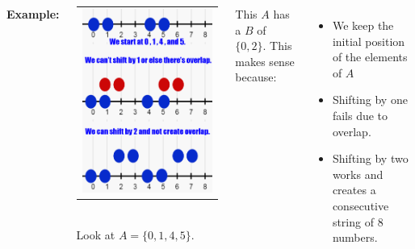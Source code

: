 \begin{columns}
{ \textcolor{colorTwo}{\textbf{Example:} }


 \begin{center}
      \begin{tabular}{c}
     \includegraphics[scale=0.5]{numberline0145.png} \\
 \end{tabular}\\
    Look at $A = \{ 0,1,4,5 \}$. \\
 \end{center}
 
 \vspace{12pt}
 
 This $A$ has a $B$ of $ \{0,2 \}$. This makes sense because:
 \begin{itemize}
     \item We keep the initial position of the elements of $A$
     \item Shifting by one fails due to overlap.
     \item Shifting by two works and creates a consecutive string of 8 numbers.
 \end{itemize} 
 
}
\end{columns}
